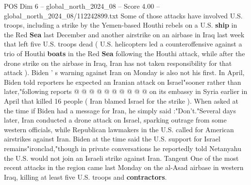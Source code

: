 \begin{textsample}{POS Dim 6 – global\_north\_2024\_08 – Score 4.00 – global\_north\_2024\_08/112242899.txt}
Some of those attacks have involved U.S. troops, including a strike by the Yemen-based Houthi rebels on a U.S. \textbf{ship} in the Red \textbf{Sea} last December and another airstrike on an airbase in Iraq last week that left five U.S. troops dead ( U.S. helicopters led a counteroffensive against a trio of Houthi \textbf{boats} in the Red \textbf{Sea} following the Houthi attack, while after the drone strike on the airbase in Iraq, Iran has not taken responsibility for that attack ).
Biden ' s warning against Iran on Monday is also not his first.
In April, Biden told reporters he expected an Iranian attack on Israel"sooner rather than later,"following reports @ @ @ @ @ @ @ @ @ @ on its embassy in Syria earlier in April that killed 16 people ( Iran blamed Israel for the strike ).
When asked at the time if Biden had a message for Iran, he simply said :"Don't."Several days later, Iran conducted a drone attack on Israel, sparking outrage from some western officials, while Republican lawmakers in the U.S. called for American airstrikes against Iran.
Biden at the time said the U.S. support for Israel remains"ironclad,"though in private conversations he reportedly told Netanyahu the U.S. would not join an Israeli strike against Iran.
Tangent One of the most recent attacks in the region came last Monday on the al-Asad airbase in western Iraq, killing at least five U.S. troops and \textbf{contractors}.

\end{textsample}
